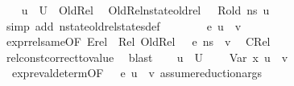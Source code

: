 \begin{isabellebody}
\ \ \isamarkupfalse%
\ {\isacartoucheopen}u{\isacharprime}{\kern0pt}\ {\isasymin}\ U{\isacartoucheclose}\ \ OldRel\ \isamarkupfalse%
\ OldRel{}{\isacharcolon}{\kern0pt}{\isachardoublequoteopen}nstate{\isacharunderscore}{\kern0pt}old{\isacharunderscore}{\kern0pt}rel\ {\isasymLambda}\ {\isasymLambda}{\isacharprime}{\kern0pt}\ R{\isacharunderscore}{\kern0pt}old\ ns\ u{\isacharprime}{\kern0pt}{\isachardoublequoteclose}\ \isamarkupfalse%
\ {\isacharparenleft}{\kern0pt}simp\ add{\isacharcolon}{\kern0pt}\ nstate{\isacharunderscore}{\kern0pt}old{\isacharunderscore}{\kern0pt}rel{\isacharunderscore}{\kern0pt}states{\isacharunderscore}{\kern0pt}def{\isacharparenright}{\kern0pt}\ \ \isanewline
\ \ \isamarkupfalse%
\ {\isachardoublequoteopen}{\isasymLambda}{\isacharprime}{\kern0pt}{\isacharcomma}{\kern0pt}{\isasymGamma}{\isacharcomma}{\kern0pt}{\isasymOmega}\ {\isasymturnstile}\ {\isasymlangle}e{}{\isacharcomma}{\kern0pt}\ u{\isacharprime}{\kern0pt}{\isasymrangle}\ {\isasymDown}\ v{\isachardoublequoteclose}\ \isamarkupfalse%
\ expr{\isacharunderscore}{\kern0pt}rel{\isacharunderscore}{\kern0pt}same{\isacharparenleft}{\kern0pt}{}{\isacharparenright}{\kern0pt}{\isacharbrackleft}{\kern0pt}OF\ Erel\ {\isacharunderscore}{\kern0pt}\ Rel{}\ OldRel{}\ {\isacartoucheopen}{\isasymLambda}{\isacharcomma}{\kern0pt}{\isasymGamma}{\isacharcomma}{\kern0pt}{\isasymOmega}\ {\isasymturnstile}\ {\isasymlangle}e{}{\isacharcomma}{\kern0pt}\ ns{\isasymrangle}\ {\isasymDown}\ v{\isacartoucheclose}{\isacharbrackright}{\kern0pt}\ \isamarkupfalse%
\ CRel\isanewline
\ \ \ \ \isamarkupfalse%
\ rel{\isacharunderscore}{\kern0pt}const{\isacharunderscore}{\kern0pt}correct{\isacharunderscore}{\kern0pt}to{\isacharunderscore}{\kern0pt}value\ \isamarkupfalse%
\ blast\isanewline
\ \ \isamarkupfalse%
\ {\isacartoucheopen}u{\isacharprime}{\kern0pt}\ {\isasymin}\ {\isacharquery}{\kern0pt}U{\isacharprime}{\kern0pt}{\isacartoucheclose}\ \isamarkupfalse%
\ {\isachardoublequoteopen}{\isasymLambda}{\isacharprime}{\kern0pt}{\isacharcomma}{\kern0pt}{\isasymGamma}{\isacharcomma}{\kern0pt}{\isasymOmega}\ {\isasymturnstile}\ {\isasymlangle}Var\ x{\isacharcomma}{\kern0pt}\ u{\isacharprime}{\kern0pt}{\isasymrangle}\ {\isasymDown}\ v{\isachardoublequoteclose}\ \isanewline
\ \ \ \ \ \isamarkupfalse%
\ \ expr{\isacharunderscore}{\kern0pt}eval{\isacharunderscore}{\kern0pt}determ{\isacharparenleft}{\kern0pt}{}{\isacharparenright}{\kern0pt}{\isacharbrackleft}{\kern0pt}OF\ {\isacartoucheopen}{\isasymLambda}{\isacharprime}{\kern0pt}{\isacharcomma}{\kern0pt}{\isasymGamma}{\isacharcomma}{\kern0pt}{\isasymOmega}\ {\isasymturnstile}\ {\isasymlangle}e{}{\isacharcomma}{\kern0pt}\ u{\isacharprime}{\kern0pt}{\isasymrangle}\ {\isasymDown}\ v{\isacartoucheclose}{\isacharbrackright}{\kern0pt}\ assume{\isacharunderscore}{\kern0pt}reduction{\isacharunderscore}{\kern0pt}args\ \isamarkupfalse%

\end{isabellebody}
